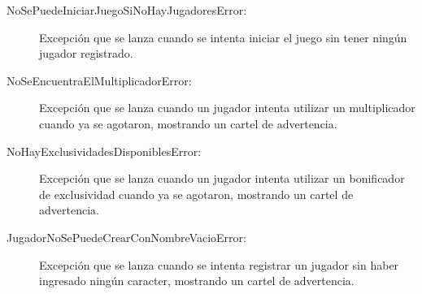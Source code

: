 \documentclass[titlepage,a4paper]{article}
\begin{document}
\begin{description}
\item[NoSePuedeIniciarJuegoSiNoHayJugadoresError:] Excepción que se lanza cuando se intenta iniciar el juego sin tener ningún jugador registrado.

\end{description}

\begin{description}
\item[NoSeEncuentraElMultiplicadorError:] Excepción que se lanza cuando un jugador intenta utilizar un multiplicador cuando ya se agotaron, mostrando un cartel de advertencia.

\end{description}

\begin{description}
\item[NoHayExclusividadesDisponiblesError:] Excepción que se lanza cuando un jugador intenta utilizar un bonificador de exclusividad cuando ya se agotaron, mostrando un cartel de advertencia.

\end{description}

\begin{description}
\item[JugadorNoSePuedeCrearConNombreVacioError:] Excepción que se lanza cuando se intenta registrar un jugador sin haber ingresado ningún caracter, mostrando un cartel de advertencia.

\end{description}
\end{document}
